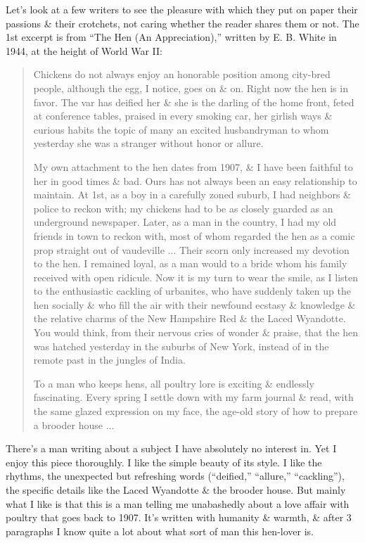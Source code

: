 \documentclass{article}
\begin{document}
Let's look at a few writers to see the pleasure with which they put on paper their passions \& their crotchets, not caring whether the reader shares them or not. The 1st excerpt is from ``The Hen (An Appreciation),'' written by E. B. White in 1944, at the height of World War II:
\begin{quotation}
	Chickens do not always enjoy an honorable position among city-bred people, although the egg, I notice, goes on \& on. Right now the hen is in favor. The var has deified her \& she is the darling of the home front, feted at conference tables, praised in every smoking car, her girlish ways \& curious habits the topic of many an excited husbandryman to whom yesterday she was a stranger without honor or allure.
	
	My own attachment to the hen dates from 1907, \& I have been faithful to her in good times \& bad. Ours has not always been an easy relationship to maintain. At 1st, as a boy in a carefully zoned suburb, I had neighbors \& police to reckon with; my chickens had to be as closely guarded as an underground newspaper. Later, as a man in the country, I had my old friends in town to reckon with, most of whom regarded the hen as a comic prop straight out of vaudeville $\ldots$ Their scorn only increased my devotion to the hen. I remained loyal, as a man would to a bride whom his family received with open ridicule. Now it is my turn to wear the smile, as I listen to the enthusiastic cackling of urbanites, who have suddenly taken up the hen socially \& who fill the air with their newfound ecstasy \& knowledge \& the relative charms of the New Hampshire Red \& the Laced Wyandotte. You would think, from their nervous cries of wonder \& praise, that the hen was hatched yesterday in the suburbs of New York, instead of in the remote past in the jungles of India.
	
	To a man who keeps hens, all poultry lore is exciting \& endlessly fascinating. Every spring I settle down with my farm journal \& read, with the same glazed expression on my face, the age-old story of how to prepare a brooder house $\ldots$
\end{quotation}
There's a man writing about a subject I have absolutely no interest in. Yet I enjoy this piece thoroughly. I like the simple beauty of its style. I like the rhythms, the unexpected but refreshing words (``deified,'' ``allure,'' ``cackling''), the specific details like the Laced Wyandotte \& the brooder house. But mainly what I like is that this is a man telling me unabashedly about a love affair with poultry that goes back to 1907. It's written with humanity \& warmth, \& after 3 paragraphs I know quite a lot about what sort of man this hen-lover is.
\end{document}
